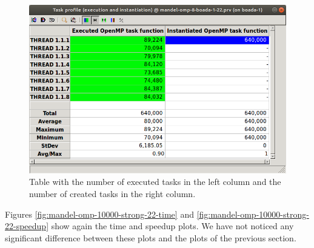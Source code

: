 \documentclass[12pt, a4paper]{article}
\begin{document}
\begin{figure}[H]
	\centering
	\includegraphics[scale=0.40]{./S2_OMP_tasks_table_22}
	\caption{Table with the number of executed tasks in the left column and the number of created tasks in the right column.}
	\label{fig:S2_OMP_tasks_table_22}
\end{figure}

Figures \ref{fig:mandel-omp-10000-strong-22-time} and \ref{fig:mandel-omp-10000-strong-22-speedup} show again the time and speedup plots. We have not noticed any significant difference between these plots and the plots of the previous section.
\end{document}
